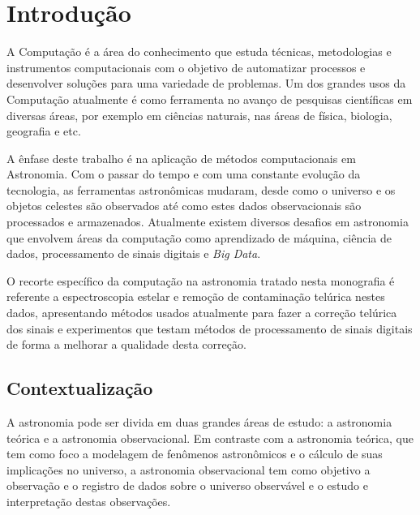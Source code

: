 \chapter{Introdução}
\label{cap:introducao}

A Computação é a área do conhecimento que estuda técnicas, metodologias e instrumentos computacionais com o objetivo de automatizar processos e desenvolver soluções para uma variedade de problemas. Um dos grandes usos da Computação atualmente é como ferramenta no avanço de pesquisas científicas em diversas áreas, por exemplo em ciências naturais, nas áreas de física, biologia, geografia e etc.

A ênfase deste trabalho é na aplicação de métodos computacionais em Astronomia. Com o passar do tempo e com uma constante evolução da tecnologia, as ferramentas astronômicas mudaram, desde como o universo e os objetos celestes são observados até como estes dados observacionais são processados e armazenados. Atualmente existem diversos desafios em astronomia que envolvem áreas da computação como aprendizado de máquina, ciência de dados, processamento de sinais digitais e \textit{Big Data}. 

O recorte específico da computação na astronomia tratado nesta monografia é referente a espectroscopia estelar e remoção de contaminação telúrica nestes dados, apresentando métodos usados atualmente para fazer a correção telúrica dos sinais e experimentos que testam métodos de processamento de sinais digitais de forma a melhorar a qualidade desta correção.

\section{Contextualização}

A astronomia pode ser divida em duas grandes áreas de estudo: a astronomia teórica e a astronomia observacional. Em contraste com a astronomia teórica, que tem como foco a modelagem de fenômenos astronômicos e o cálculo de suas implicações no universo, a astronomia observacional tem como objetivo a observação e o registro de dados sobre o universo observável e o estudo e interpretação destas observações.  

